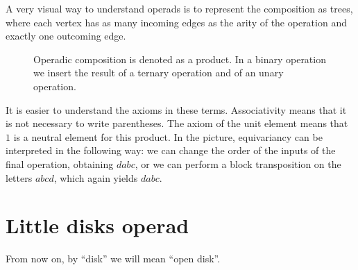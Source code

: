 \documentclass[TFM.tex]{subfiles}
\begin{document}


A very visual way to understand operads is to represent the composition as trees, where each vertex has as many incoming edges as the arity of the operation and exactly one outcoming edge. 

\begin{figure}[h!]
\caption{Operadic composition is denoted as a product. In a binary operation we insert the result of a ternary operation and of an unary operation.}
\end{figure}

It is easier to understand the axioms in these terms. Associativity means that it is not necessary to write parentheses. The axiom of the unit element means that $1$ is a neutral element for this product. In the picture, equivariancy can be interpreted in the following way: we can change the order of the inputs of the final operation, obtaining $dabc$, or we can perform a block transposition on the letters $abcd$, which again yields $dabc$. 




\section{Little disks operad}\label{little}

From now on, by ``disk'' we will mean ``open disk''. 
 
\end{document}
